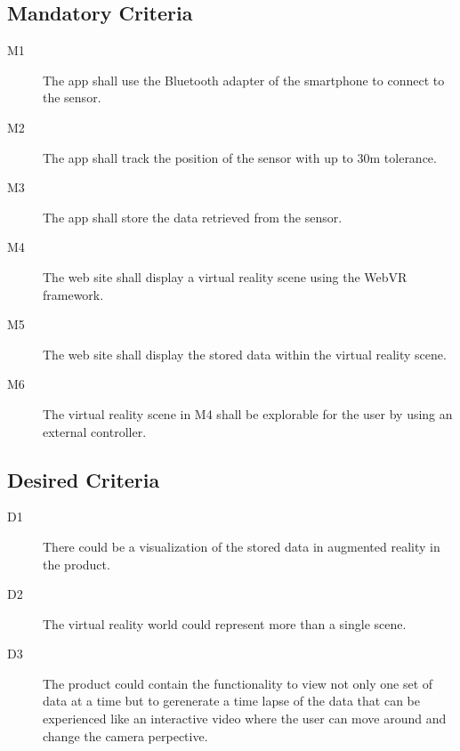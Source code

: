 \subsection{Mandatory Criteria}

\begin{description}
	\item[M1] The app shall use the Bluetooth adapter of the smartphone to connect to the sensor.
	\item[M2] The app shall track the position of the sensor with up to 30m tolerance.
	\item[M3] The app shall store the data retrieved from the sensor.
	\item[M4] The web site shall display a virtual reality scene using the WebVR framework.
	\item[M5] The web site shall display the stored data within the virtual reality scene.
	\item[M6] The virtual reality scene in M4 shall be explorable for the user by using an external controller.
	
\end{description}

\subsection{Desired Criteria}

\begin{description}
  \item[D1] There could be a visualization of the stored data in augmented reality in the product.
  \item[D2] The virtual reality world could represent more than a single scene.
  \item[D3] The product could contain the functionality to view not only one set of data at a time but to gerenerate a time lapse of the data that can be experienced like an interactive video where the user can move around and change the camera perpective.
\end{description}
